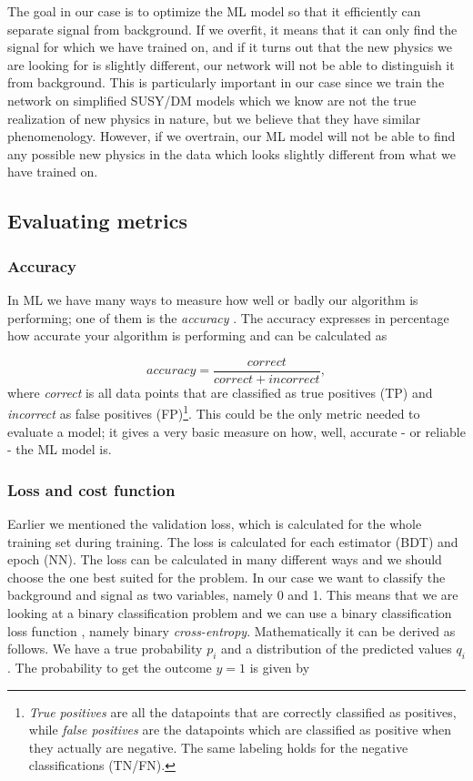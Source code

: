 The goal in our case is to optimize the ML model so that it efficiently can separate signal from background. If we overfit, it means that it can only find the signal for which we have trained on, and if it turns out that the new physics we are looking for is slightly different, our network will not be able to distinguish it from background. This is particularly important in our case since we train the network on simplified SUSY/DM models which we know are not the true realization of new physics in nature, but we believe that they have similar phenomenology. However, if we overtrain, our ML model will not be able to find any possible new physics in the data which looks slightly different from what we have trained on.

\subsection{Evaluating metrics}

\subsubsection{Accuracy}
In ML we have many ways to measure how well or badly our algorithm is performing; one of them is the \textit{accuracy} \cite{accuracy}. The accuracy expresses in percentage how accurate your algorithm is performing and can be calculated as

\begin{equation}
    \label{eq:acc}
    accuracy = \frac{correct}{correct + incorrect},
\end{equation}
where \textit{correct} is all data points that are classified as true positives (TP) and \textit{incorrect} as false positives (FP)\footnote{\textit{True positives} are all the datapoints that are correctly classified as positives, while \textit{false positives} are the datapoints which are classified as positive when they actually are negative. The same labeling holds for the negative classifications (TN/FN).}. This could be the only metric needed to evaluate a model; it gives a very basic measure on how, well, accurate - or reliable - the ML model is. 

\subsubsection{Loss and cost function}
Earlier we mentioned the validation loss, which is calculated for the whole training set during training. The loss is calculated for each estimator (BDT) and epoch (NN). The loss can be calculated in many different ways and we should choose the one best suited for the problem. In our case we want to classify the background and signal as two variables, namely 0 and 1. This means that we are looking at a binary classification problem and we can use a binary classification loss function \cite{Loss}, namely binary \textit{cross-entropy}. Mathematically it can be derived as follows. We have a true probability $p_i$ and a distribution of the predicted values $q_i$. The probability to get the outcome $y=1$ is given by

